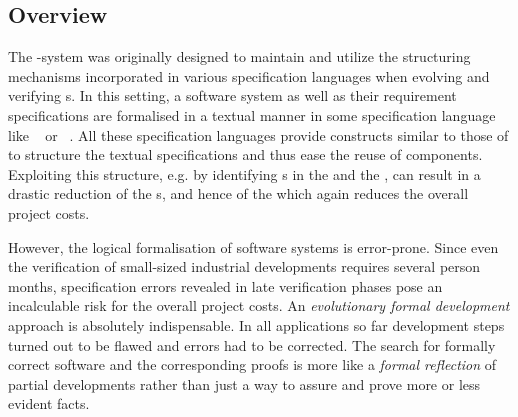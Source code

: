 \subsection{Overview}

The {\maya}-system was originally designed to maintain and utilize the structuring
mechanisms incorporated in various specification
languages when evolving and verifying
{s}. In this setting, a software system as well as
their requirement specifications are formalised in a textual manner in some specification
language like {\casl}~\cite{CoFI:2004:CASL-RM} or {\vsesl}~\cite{VSE00}. All these
specification languages provide constructs similar to those of {\omdoc} to structure the
textual specifications and thus ease the reuse of
components. Exploiting this structure, e.g.  by identifying
{s} in the {} and the
{}, can result in a drastic reduction of the
{s}, and hence of the {} which again
reduces the overall project costs.

However, the logical formalisation of software systems is error-prone.  Since even the
verification of small-sized industrial developments requires several person months,
specification errors revealed in late verification phases pose an incalculable risk for
the overall project costs. An {\emph{evolutionary formal
    development}} approach is absolutely
indispensable. In all applications so far development steps turned out to be flawed and
errors had to be corrected. The search for formally correct software and the corresponding
proofs is more like a {\emph{formal reflection}} of partial developments rather than just
a way to assure and prove more or less evident facts.

